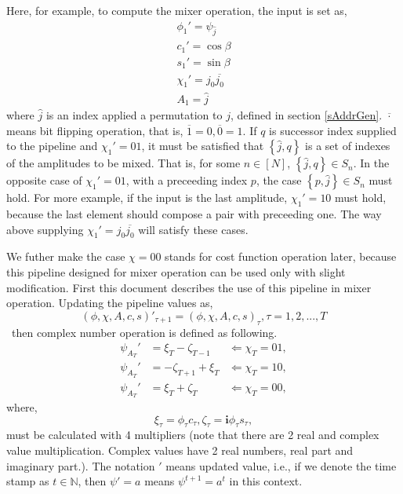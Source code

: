 \documentclass[a4paper]{article}
\newcommand{\eqlabel}[1]{\label{#1}}
\newcommand{\br}[1]{\left(#1\right)}
\newcommand{\cbr}[1]{\left\{#1\right\}}
\newcommand{\ci}{\mathbf{i}}
\newcommand{\sN}{\mathbb{N}}
\newcommand{\hatj}{{\hat{j}}}
\begin{document}
Here, for example, to compute the mixer operation, the input is set as,
\begin{equation}
    \eqlabel{eminit}
    \begin{matrix}
        \phi_{1}' = \psi_\hatj\\
        c_1' = \cos\beta\\
        s_1' = \sin\beta\\
        \chi_1' = j_0\overline{j_0}\\
        A_1 = \hatj
    \end{matrix} 
\end{equation}
where \(\hatj\) is an index applied a permutation to \(j\), defined in section \ref{sAddrGen}. \(\overline{\cdot}\) means bit flipping operation, that is, \(\overline{1} = 0, \overline{0} = 1\). If \(q\) is successor index supplied to the pipeline and \(\chi_1' = 01\), it must be satisfied that \(\cbr{\hatj, q}\) is a set of indexes of the amplitudes to be mixed. That is, for some \(n\in[N]\), \(\cbr{\hatj, q}\in S_n\). In the opposite case of \(\chi_1' = 01\), with a preceeding index \(p\), the case \(\cbr{p, \hatj}\in S_n\) must hold. For more example, if the input is the last amplitude, \(\chi_1' = 10\) must hold, because the last element should compose a pair with preceeding one. The way above supplying \(\chi_1' = j_0\overline{j_0}\) will satisfy these cases.

We futher make the case \(\chi=00\) stands for cost function operation later, because this pipeline designed for mixer operation can be used only with slight modification. First this document describes the use of this pipeline in mixer operation.
Updating the pipeline values as,
\[
    \br{\phi, \chi, A, c, s}'_{\tau +1} = \br{\phi, \chi, A,c,s}_{\tau}, \tau=1,2,...,T
\]  \
then complex number operation is defined as following.
\begin{align}
    \eqlabel{ep00}
    \psi_{A_{T}}' &= \xi_{T} - \zeta_{T-1} &\Leftarrow \chi_T = 01,\\
    \eqlabel{ep01}
    \psi_{A_{T}}' &= -\zeta_{T+1} + \xi_{T} &\Leftarrow \chi_T = 10,\\
    \eqlabel{ep10}
    \psi_{A_{T}}' &= \xi_{T} +  \zeta_{T} &\Leftarrow \chi_T = 00,
\end{align}
where, 
\begin{equation}
    \xi_{\tau} = \phi_\tau c_\tau, \zeta_\tau = \ci\phi_\tau  s_\tau,
\end{equation}
must be calculated with 4 multipliers (note that there are 2 real and complex value multiplication. Complex values have 2 real numbers, real part and imaginary part.).
The notation \('\) means updated value, i.e., if we denote the time stamp as \(t\in\sN\), then \(\psi' = a\) means \(\psi^{t+1} = a^t\) in this context.
\end{document}
